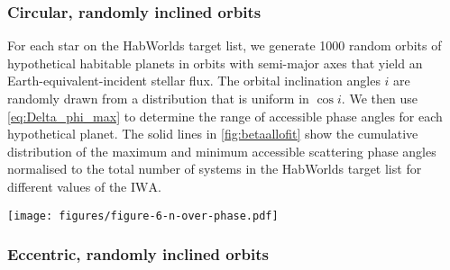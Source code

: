 \documentclass[
    usenatbib,
]{mnras}
\newcommand{\IWA}{\ensuremath{\mathrm{IWA}}}
\newcommand{\hwo}{HabWorlds}
\begin{document}
\subsubsection{Circular, randomly inclined orbits}
\label{sec:circular}

For each star on the \hwo{} target list, we generate \num{1000} random orbits of hypothetical habitable planets in orbits with semi-major axes that yield an Earth-equivalent-incident stellar flux. 
%
The orbital inclination angles $i$ are randomly drawn from a distribution 
that is uniform in $\cos i$. 
%
We then use \cref{eq:Delta_phi_max} to determine the range of 
accessible phase angles for each hypothetical planet.
%
The solid lines in \cref{fig:betaallofit} show the cumulative 
distribution of the maximum and minimum accessible scattering phase 
angles normalised to the total number of systems in the \hwo{} 
target list for different values of the \IWA{}.


\begin{figure*}%
    \centering
    \texttt{[image: figures/figure-6-n-over-phase.pdf]}
    \caption{
        The cumulative distributions of the most extreme phase angles accessible for different \IWA{} and for randomly inclined, circular orbits
        (solid lines) and randomly inclined, elliptical orbits (dashed lines).
        The top $x$-axis indicates the minimum and the 
        bottom $x$-axis the maximum accessible phase angle.
        These angles are symmetric about quadrature (90 degrees).
        The $y$-axis on the left indicates the number of planetary systems 
        divided by the number of Monte Carlo samples and is thus normalised to 
        the number of systems on the target list.
        The $y$-axis on the right indicates the number of systems, assuming \qty{24}{\percent} of them have an Earth-like planet in their HZ.
    }
    \label{fig:betaallofit}
\end{figure*}

\subsubsection{Eccentric, randomly inclined orbits}
\label{sec:eccentric}
\end{document}
